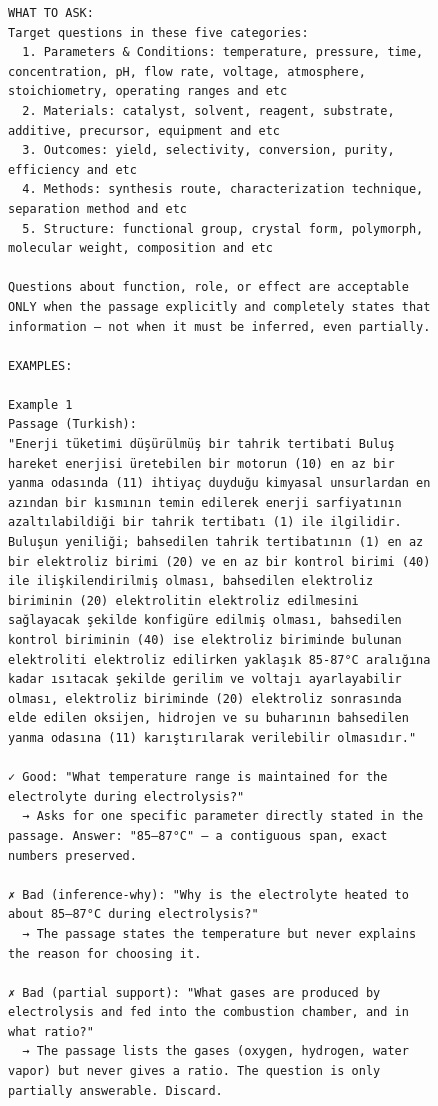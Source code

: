 \begin{figure}[h!]
\begin{minipage}{0.95\textwidth}
\begin{Verbatim}[breaklines=true, breakanywhere=true]
WHAT TO ASK:
Target questions in these five categories:
  1. Parameters & Conditions: temperature, pressure, time, concentration, pH, flow rate, voltage, atmosphere, stoichiometry, operating ranges and etc
  2. Materials: catalyst, solvent, reagent, substrate, additive, precursor, equipment and etc
  3. Outcomes: yield, selectivity, conversion, purity, efficiency and etc
  4. Methods: synthesis route, characterization technique, separation method and etc
  5. Structure: functional group, crystal form, polymorph, molecular weight, composition and etc

Questions about function, role, or effect are acceptable ONLY when the passage explicitly and completely states that information — not when it must be inferred, even partially.

EXAMPLES:

Example 1
Passage (Turkish):
"Enerji̇ tüketi̇mi̇ düşürülmüş bi̇r tahri̇k terti̇bati Buluş hareket enerjisi üretebilen bir motorun (10) en az bir yanma odasında (11) ihtiyaç duyduğu kimyasal unsurlardan en azından bir kısmının temin edilerek enerji sarfiyatının azaltılabildiği bir tahrik tertibatı (1) ile ilgilidir. Buluşun yeniliği; bahsedilen tahrik tertibatının (1) en az bir elektroliz birimi (20) ve en az bir kontrol birimi (40) ile ilişkilendirilmiş olması, bahsedilen elektroliz biriminin (20) elektrolitin elektroliz edilmesini sağlayacak şekilde konfigüre edilmiş olması, bahsedilen kontrol biriminin (40) ise elektroliz biriminde bulunan elektroliti elektroliz edilirken yaklaşık 85-87°C aralığına kadar ısıtacak şekilde gerilim ve voltajı ayarlayabilir olması, elektroliz biriminde (20) elektroliz sonrasında elde edilen oksijen, hidrojen ve su buharının bahsedilen yanma odasına (11) karıştırılarak verilebilir olmasıdır."

✓ Good: "What temperature range is maintained for the electrolyte during electrolysis?"
  → Asks for one specific parameter directly stated in the passage. Answer: "85–87°C" — a contiguous span, exact numbers preserved.

✗ Bad (inference-why): "Why is the electrolyte heated to about 85–87°C during electrolysis?"
  → The passage states the temperature but never explains the reason for choosing it.

✗ Bad (partial support): "What gases are produced by electrolysis and fed into the combustion chamber, and in what ratio?"
  → The passage lists the gases (oxygen, hydrogen, water vapor) but never gives a ratio. The question is only partially answerable. Discard.


\end{Verbatim}
\end{minipage}
\end{figure}
